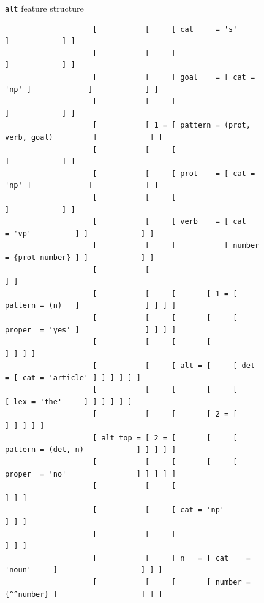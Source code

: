 \documentclass[12pt]{article}
\begin{document}
{\begin{figure}[h!]
{\begin{verbatim}
\end{verbatim}
}
\caption{\texttt{alt} feature structure}
\label{fig:easy-alt}
\end{figure}

\pagebreak

\begin{figure}[h!]
{\scriptsize
\begin{verbatim}
                    [           [     [ cat     = 's'                        ]            ] ]
                    [           [     [                                      ]            ] ]
                    [           [     [ goal    = [ cat = 'np' ]             ]            ] ]
                    [           [     [                                      ]            ] ]
                    [           [ 1 = [ pattern = (prot, verb, goal)         ]            ] ]
                    [           [     [                                      ]            ] ]
                    [           [     [ prot    = [ cat = 'np' ]             ]            ] ]
                    [           [     [                                      ]            ] ]
                    [           [     [ verb    = [ cat    = 'vp'          ] ]            ] ]
                    [           [     [           [ number = {prot number} ] ]            ] ]
                    [           [                                                         ] ]
                    [           [     [       [ 1 = [ pattern = (n)   ]               ] ] ] ]
                    [           [     [       [     [ proper  = 'yes' ]               ] ] ] ]
                    [           [     [       [                                       ] ] ] ]
                    [           [     [ alt = [     [ det     = [ cat = 'article' ] ] ] ] ] ]
                    [           [     [       [     [           [ lex = 'the'     ] ] ] ] ] ]
                    [           [     [       [ 2 = [                               ] ] ] ] ]
                    [ alt_top = [ 2 = [       [     [ pattern = (det, n)            ] ] ] ] ]
                    [           [     [       [     [ proper  = 'no'                ] ] ] ] ]
                    [           [     [                                                 ] ] ]
                    [           [     [ cat = 'np'                                      ] ] ]
                    [           [     [                                                 ] ] ]
                    [           [     [ n   = [ cat    = 'noun'     ]                   ] ] ]
                    [           [     [       [ number = {^^number} ]                   ] ] ]

\end{verbatim}}
\end{figure}}
\end{document}

